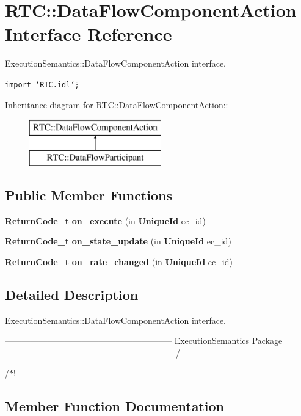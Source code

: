 \section{RTC::Data\-Flow\-Component\-Action Interface Reference}
\label{interfaceRTC_1_1DataFlowComponentAction}
Execution\-Semantics::Data\-Flow\-Component\-Action interface.  


{\tt import \char`\"{}RTC.idl\char`\"{};}

Inheritance diagram for RTC::Data\-Flow\-Component\-Action::\begin{figure}[H]
\begin{center}
\leavevmode
\includegraphics[height=2cm]{interfaceRTC_1_1DataFlowComponentAction}
\end{center}
\end{figure}
\subsection*{Public Member Functions}
\begin{CompactItemize}
\item 
{\bf Return\-Code\_\-t} {\bf on\_\-execute} (in {\bf Unique\-Id} ec\_\-id)
\item 
{\bf Return\-Code\_\-t} {\bf on\_\-state\_\-update} (in {\bf Unique\-Id} ec\_\-id)
\item 
{\bf Return\-Code\_\-t} {\bf on\_\-rate\_\-changed} (in {\bf Unique\-Id} ec\_\-id)
\end{CompactItemize}


\subsection{Detailed Description}
Execution\-Semantics::Data\-Flow\-Component\-Action interface. 

----------------------------------------------------------- Execution\-Semantics Package ------------------------------------------------------------/

/$\ast$! 



\subsection{Member Function Documentation}
